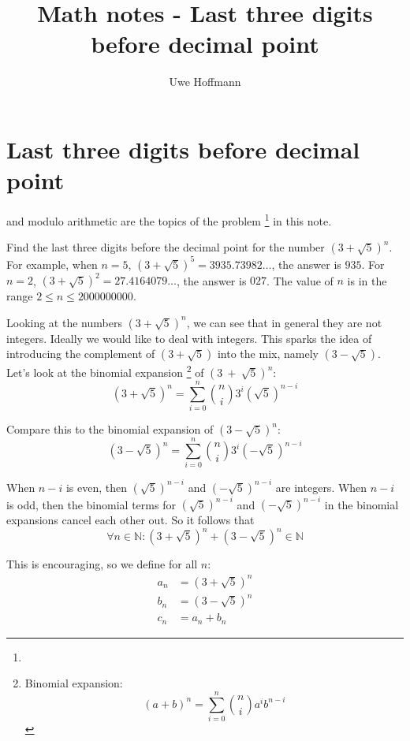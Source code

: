 

\title{Math notes - Last three digits before decimal point}
\author{Uwe Hoffmann}



\setcounter{chapter}{1}
\section*{Last three digits before decimal point}

 and modulo arithmetic are the topics of the problem \footnote{} in this note.

\vspace{10 mm}
\begin{problem}
Find the last three digits before the decimal point for the number $(3 + \sqrt{5})^n$. For example, when $n = 5$, $(3 + \sqrt{5})^5 = 3935.73982\ldots$, the answer is $935$. For $n = 2$, $(3 + \sqrt{5})^2 = 27.4164079\ldots$, the answer is $027$.  The value of $n$ is in the range $2 \le n \le 2000000000$. 
\end{problem}

Looking at the numbers $(3 + \sqrt{5})^n$, we can see that in general they are not integers. Ideally we would like to deal with integers. This sparks the idea of introducing the complement of $(3 + \sqrt{5})$ into the mix, namely $(3 - \sqrt{5})$. Let's look at the binomial expansion 
\footnote{Binomial expansion:
\[
(a + b)^n = \sum^{n}_{i=0} \binom{n}{i} a^{i}b^{n-i}
\]
} of $(3~+~\sqrt{5})^n$:
\[
	(3 + \sqrt{5})^n = \sum^{n}_{i=0} \binom{n}{i} 3^{i}(\sqrt{5})^{n-i}
\]

\noindent Compare this to the binomial expansion of $(3 - \sqrt{5})^n$:
\[
	(3 - \sqrt{5})^n = \sum^{n}_{i=0} \binom{n}{i} 3^{i}(-\sqrt{5})^{n-i}
\]

\noindent When $n-i$ is even, then $(\sqrt{5})^{n-i}$ and $(-\sqrt{5})^{n-i}$ are integers. When $n-i$ is odd, then the binomial terms  for $(\sqrt{5})^{n-i}$ and $(-\sqrt{5})^{n-i}$  in the binomial expansions cancel each other out. So it follows that
\[
 	\forall n \in \mathbb{N}: (3 + \sqrt{5})^n + (3 - \sqrt{5})^n \in \mathbb{N}
\]

\noindent This is encouraging, so we define for all $n$:
\[
\begin{split}
	a_n & = (3 + \sqrt{5})^n \\
	b_n & = (3 - \sqrt{5})^n \\
	c_n & = a_n + b_n
\end{split}	
\]

